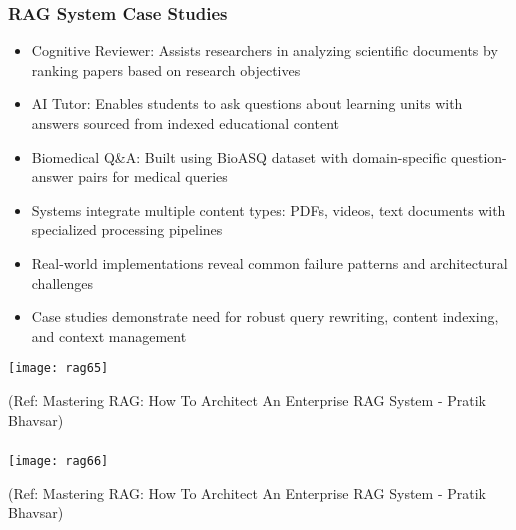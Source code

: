 \begin{frame}[fragile]\frametitle{RAG System Case Studies}
      \begin{itemize}
        \item Cognitive Reviewer: Assists researchers in analyzing scientific documents by ranking papers based on research objectives
        \item AI Tutor: Enables students to ask questions about learning units with answers sourced from indexed educational content
        \item Biomedical Q\&A: Built using BioASQ dataset with domain-specific question-answer pairs for medical queries
        \item Systems integrate multiple content types: PDFs, videos, text documents with specialized processing pipelines
        \item Real-world implementations reveal common failure patterns and architectural challenges
        \item Case studies demonstrate need for robust query rewriting, content indexing, and context management
      \end{itemize}
	  
	\begin{center}
	\texttt{[image: rag65]}
	
	{\tiny (Ref: Mastering RAG: How To Architect An Enterprise RAG System - Pratik Bhavsar)}
	
	\end{center}	  
\end{frame}

\begin{frame}[fragile]\frametitle{}

	\begin{center}
	\texttt{[image: rag66]}
	
	{\tiny (Ref: Mastering RAG: How To Architect An Enterprise RAG System - Pratik Bhavsar)}
	
	\end{center}
	
	
\end{frame}

